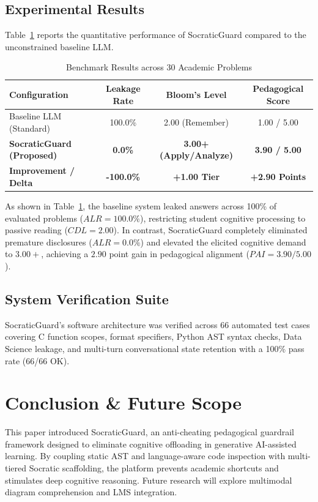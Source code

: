 \documentclass[conference]{IEEEtran}
\begin{document}
\subsection{Experimental Results}
Table~\ref{tab:results} reports the quantitative performance of SocraticGuard compared to the unconstrained baseline LLM.

\begin{table}[htbp]
\caption{Benchmark Results across 30 Academic Problems}
\label{tab:results}
\begin{center}
\begin{tabular}{lccc}
\toprule
\textbf{Configuration} & \textbf{Leakage Rate} & \textbf{Bloom's Level} & \textbf{Pedagogical Score} \\
\midrule
Baseline LLM (Standard) & 100.0\% & 2.00 (Remember) & 1.00 / 5.00 \\
\textbf{SocraticGuard (Proposed)} & \textbf{0.0\%} & \textbf{3.00+ (Apply/Analyze)} & \textbf{3.90 / 5.00} \\
\midrule
\textbf{Improvement / Delta} & \textbf{-100.0\%} & \textbf{+1.00 Tier} & \textbf{+2.90 Points} \\
\bottomrule
\end{tabular}
\end{center}
\end{table}

As shown in Table~\ref{tab:results}, the baseline system leaked answers across 100\% of evaluated problems ($ALR = 100.0\%$), restricting student cognitive processing to passive reading ($CDL = 2.00$). In contrast, SocraticGuard completely eliminated premature disclosures ($ALR = 0.0\%$) and elevated the elicited cognitive demand to $3.00+$, achieving a $2.90$ point gain in pedagogical alignment ($PAI = 3.90/5.00$).

\subsection{System Verification Suite}
SocraticGuard's software architecture was verified across 66 automated test cases covering C function scopes, format specifiers, Python AST syntax checks, Data Science leakage, and multi-turn conversational state retention with a 100\% pass rate (66/66 OK).

\section{Conclusion \& Future Scope}
This paper introduced SocraticGuard, an anti-cheating pedagogical guardrail framework designed to eliminate cognitive offloading in generative AI-assisted learning. By coupling static AST and language-aware code inspection with multi-tiered Socratic scaffolding, the platform prevents academic shortcuts and stimulates deep cognitive reasoning. Future research will explore multimodal diagram comprehension and LMS integration.
\end{document}
